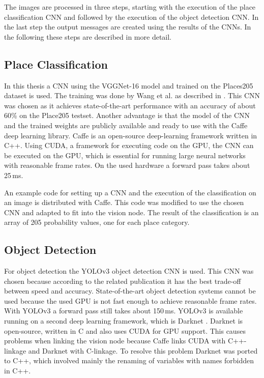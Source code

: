 The images are processed in three steps, starting with the execution of the place classification CNN and followed by the execution of the object detection CNN. In the last step the output messages are created using the results of the CNNs. In the following these steps are described in more detail. 

\subsection{Place Classification}

In this thesis a CNN using the VGGNet-16 model and trained on the Places205 dataset is used. The training was done by Wang et al. as described in \cite{PlaceCNN}.
This CNN was chosen as it achieves state-of-the-art performance with an accuracy of about 60\% on the Place205 testset. Another advantage is that the model of the CNN and the trained weights are publicly available and ready to use with the Caffe deep learning library. Caffe \cite{caffe} is an open-source deep-learning framework written in C++. Using CUDA, a framework for executing code on the GPU, the CNN can be executed on the GPU, which is essential for running large neural networks with reasonable frame rates. On the used hardware a forward pass takes about 25\,ms. 

An example code for setting up a CNN and the execution of the classification on an image is distributed with Caffe. This code was modified to use the chosen CNN and adapted to fit into the vision node. The result of the classification is an array of 205 probability values, one for each place category.

\subsection{Object Detection} 

For object detection the YOLOv3 \cite{yolo3} object detection CNN is used. This CNN was chosen because according to the related publication it has the best trade-off between speed and accuracy. State-of-the-art object detection systems cannot be used because the used GPU is not fast enough to achieve reasonable frame rates. With YOLOv3 a forward pass still takes about 150\,ms. YOLOv3 is available running on a second deep learning framework, which is Darknet \cite{darknet}. Darknet is open-source, written in C and also uses CUDA for GPU support. This causes problems when linking the vision node because Caffe links CUDA with C++-linkage and Darknet with C-linkage. To resolve this problem Darknet was ported to C++, which involved mainly the renaming of variables with names forbidden in C++. 

